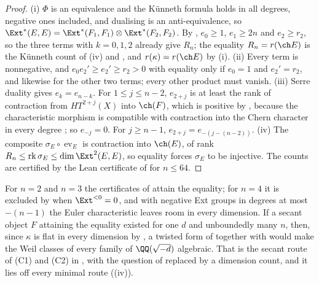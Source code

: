 \begin{proof}
(i) $\Phi$ is an equivalence and the K\"unneth formula holds in all degrees,
negative ones included, and dualising is an anti-equivalence, so
$\Ext^{*}(E,E)=\Ext^{*}(F_{1},F_{1})\otimes\Ext^{*}(F_{2},F_{2})$. By
, $e_{0}\ge1$, $e_{1}\ge2n$ and $e_{2}\ge r_{2}$, so the
three terms with $k=0,1,2$ already give $R_{n}$; the equality $R_{n}=r(\ch E)$ is
the K\"unneth count of (iv) and , and
$r(\kappa)=r(\ch E)$ by (i). (ii) Every term is nonnegative,
and $e_{0}e_{2}'\ge e_{2}'\ge r_{2}>0$ with equality only if $e_{0}=1$ and
$e_{2}'=r_{2}$, and likewise for the other two terms; every other product must
vanish. (iii) Serre duality gives $e_{k}=e_{n-k}$. For $1\le j\le n-2$, $e_{2+j}$ is
at least the rank of contraction from $HT^{2+j}(X)$ into $\ch(F)$, which is
positive by , because the characteristic morphism is
compatible with contraction into the Chern character in every degree
\cite{CRV12}; so $e_{-j}=0$. For $j\ge n-1$, $e_{2+j}=e_{-(j-(n-2))}$.
(iv) The composite $\sigma_{E}\circ\operatorname{ev}_{E}$
is contraction into $\ch(E)$, of rank $R_{n}\le\operatorname{rk}\sigma_{E}\le
\dim\Ext^{2}(E,E)$, so equality forces $\sigma_{E}$ to be injective. The counts
are certified by the Lean certificate of \cite{BMB26} for $n\le64$.
\end{proof}

For $n=2$ and $n=3$ the certificates of  attain the
equality; for $n=4$ it is excluded by  when
$\Ext^{<0}=0$, and with negative Ext groups in degrees at most $-(n-1)$ the
Euler characteristic leaves room in every dimension. If a secant object $F$
attaining the equality existed for one $d$ and unboundedly many $n$, then,
since $\kappa$ is flat in every dimension by
, a twisted form of  together with
 would make the Weil classes of every family of
$\QQ(\sqrt{-d})$ algebraic. That is the secant route of (C1) and (C2) in
, with the question of \cite{Mar25b} replaced by a
dimension count, and it lies off every minimal route ((iv)).


